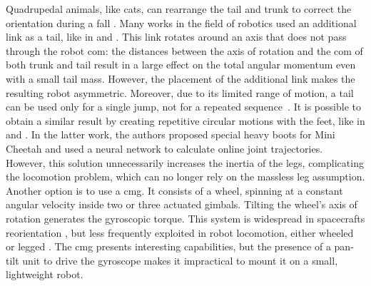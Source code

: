 \documentclass[letterpaper, 10 pt, conference]{ieeeconf}      %
\begin{document}
Quadrupedal animals, like cats, can rearrange the tail and trunk to correct the orientation during a fall \cite{kane1969dynamical}.
Many works in the field of robotics used an additional link as a tail, like in \cite{chu2019null} and \cite{wenger2016frontal}.
This link rotates around an axis that does not pass through the robot \gls{com}: the distances between the axis of rotation and the \gls{com} of both trunk and tail result in a large effect on the total angular momentum even with a small tail mass.
However, the placement of the additional link makes the resulting robot asymmetric. Moreover, due to its limited range of motion, a tail can be used only for a single jump, not for a repeated sequence~\cite{johnson2012tail}.
It is possible to obtain a similar result by creating repetitive circular motions with the feet, like in \cite{hoffman2021exploiting} and \cite{kurtz2021mini}. In the latter work, the authors proposed special heavy boots for Mini Cheetah and used a neural network to calculate online joint trajectories. However, this solution unnecessarily increases the inertia of the legs, complicating the locomotion problem, which can no longer rely on the massless leg assumption. %
Another option is to use a \gls{cmg}.
It consists of a wheel, spinning at a constant angular velocity inside two or three actuated gimbals.
Tilting the wheel's axis of rotation generates the gyroscopic torque.
This system is widespread in spacecrafts reorientation \cite{yoon2002spacecraft}, but less frequently exploited in robot locomotion, either wheeled \cite{brown1996single} or legged \cite{mikhalkov2021gyrubot}.
The \gls{cmg} presents interesting capabilities, but the presence of a pan-tilt unit to drive the gyroscope makes it impractical to mount it on a small, lightweight robot.
\end{document}

